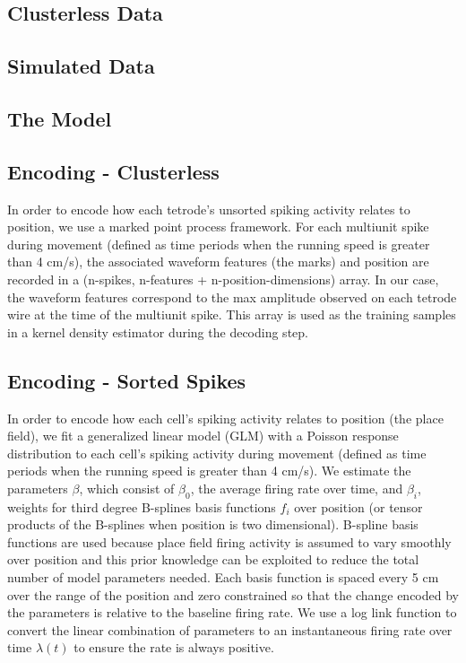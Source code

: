 \documentclass[times, twoside]{zHenriquesLab-StyleBioRxiv}
\begin{document}
\subsection*{Clusterless Data}
\subsection*{Simulated Data}

\subsection*{The Model}

\subsection*{Encoding - Clusterless}
In order to encode how each tetrode's unsorted spiking activity relates to position, we use a marked point process framework. For each multiunit spike during movement (defined as time periods when the running speed is greater than 4 cm/s), the associated waveform features (the marks) and position are recorded in a (n-spikes, n-features + n-position-dimensions) array. In our case, the waveform features correspond to the max amplitude observed on each tetrode wire at the time of the multiunit spike. This array is used as the training samples in a kernel density estimator during the decoding step.

\subsection*{Encoding - Sorted Spikes}
In order to encode how each cell's spiking activity relates to position (the place field), we fit a generalized linear model (GLM) with a Poisson response distribution to each cell's spiking activity during movement (defined as time periods when the running speed is greater than 4 cm/s). We estimate the parameters $\beta$, which consist of $\beta_{0}$, the average firing rate over time, and $\beta_{i}$, weights for third degree B-splines basis functions $f_{i}$ over position (or tensor products of the B-splines when position is two dimensional). B-spline basis functions are used because place field firing activity is assumed to vary smoothly over position and this prior knowledge can be exploited to reduce the total number of model parameters needed. Each basis function is spaced every 5 cm over the range of the position and zero constrained so that the change encoded by the parameters is relative to the baseline firing rate. We use a log link function to convert the linear combination of parameters to an instantaneous firing rate over time $\lambda(t)$ to ensure the rate is always positive. 
\end{document}
